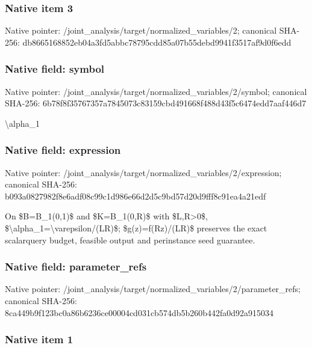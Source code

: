 \documentclass[10pt,a4paper]{article}
\begin{document}
\subsubsection{Native item 3}


Native pointer: /joint\_analysis/target/n\allowbreak{}ormalized\_variables/2; canonical SHA-256: db8665168852eb04a3fd5abb\allowbreak{}c78795cdd85a07b55debd994\allowbreak{}1f3517af9d0f6edd



\subsubsection{Native field: symbol}


Native pointer: /joint\_analysis/target/n\allowbreak{}ormalized\_variables/2/sy\allowbreak{}mbol; canonical SHA-256: 6b78f8f35767357a7845073c\allowbreak{}83159cbd491668f488d43f5c\allowbreak{}6474edd7aaf446d7


\textbackslash{}alpha\_1


\subsubsection{Native field: expression}


Native pointer: /joint\_analysis/target/n\allowbreak{}ormalized\_variables/2/ex\allowbreak{}pression; canonical SHA-256: b093a0827982f8e6adf08c99\allowbreak{}c1d986e66d2d5c9bd57d20d9\allowbreak{}fff8c91ea4a21edf


On \$B=B\_1(0,1)\$ and \$K=B\_1(0,R)\$ with \$L,R>0\$, \$\textbackslash{}alpha\_1=\textbackslash{}varepsilon/(LR)\$; \$g(z)=f(Rz)/(LR)\$ preserves the exact scalarquery budget, feasible output and perinstance seed guarantee.


\subsubsection{Native field: parameter\_refs}


Native pointer: /joint\_analysis/target/n\allowbreak{}ormalized\_variables/2/pa\allowbreak{}rameter\_refs; canonical SHA-256: 8ca449b9f123bc0a86b6236c\allowbreak{}e00004cd031cb574db5b260b\allowbreak{}442fa0d92a915034



\subsubsection{Native item 1}
\end{document}
